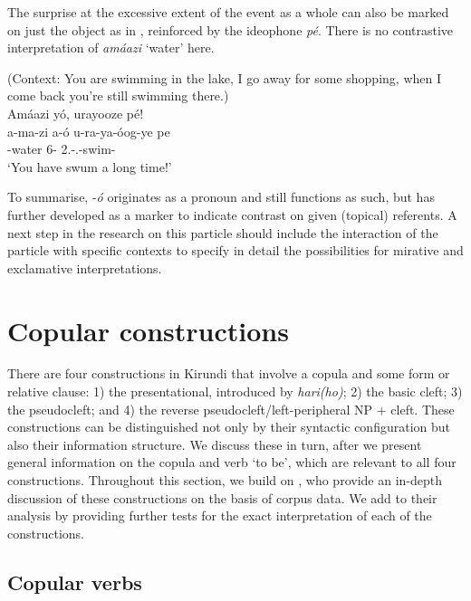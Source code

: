 \documentclass[output=paper]{langscibook}
\begin{document}
The surprise at the excessive extent of the event as a whole can also be marked on just the object as in , reinforced by the ideophone \textit{pé}. There is no contrastive interpretation of \textit{amáazi} ‘water’ here.

\ea
\label{bkm:Ref75265013}
(Context: You are swimming in the lake, I go away for some shopping, when I come back you’re still swimming there.)\\
Amáazi yó, urayooze pé!\\
\gll
a-ma-zi  a-ó  u-ra-ya-óog-ye  pe\\
-{}water  6-\CM{}  2\SG.\SM{}-\PRS.\OM{}-swim-\PFV{}  \IDEO{}\\
\glt
‘You have swum a long time!’\\

\z

To summarise, -\textit{ó} originates as a pronoun and still functions as such, but has further developed as a marker to indicate contrast on given (topical) referents. A next step in the research on this particle should include the interaction of the particle with specific contexts to specify in detail the possibilities for mirative and exclamative interpretations.

\section{Copular constructions}
\label{bkm:Ref72334782}
There are four constructions in Kirundi that involve a copula and some form or relative clause: 1) the presentational, introduced by \textit{hari(ho)}; 2) the basic cleft; 3) the pseudocleft; and 4) the reverse pseudocleft\slash left\hyp peripheral NP + cleft. These constructions can be distinguished not only by their syntactic configuration but also their information structure. We discuss these in turn, after we present general information on the copula and verb ‘to be’, which are relevant to all four constructions. Throughout this section, we build on \citet{LafkiouiEtAl2016}, who provide an in-depth discussion of these constructions on the basis of corpus data. We add to their analysis by providing further tests for the exact interpretation of each of the constructions.

\subsection{Copular verbs}
\end{document}
